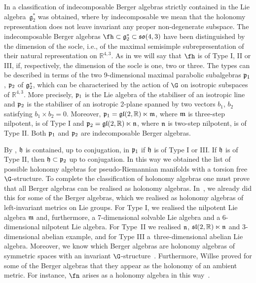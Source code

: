 In \cite{FK} a classification of indecomposable Berger algebras strictly contained in the Lie algebra~$\mathfrak g_2^*$ was obtained, where by indecomposable we mean that the holonomy representation does not leave invariant any proper non-degenerate subspace. The indecomposable Berger algebras $\fh \subset \mathfrak g_2^* \subset \mathfrak{so}(4, 3)$ have been distinguished by the dimension of the socle, i.e., of the maximal semisimple subrepresentation of their natural representation on ${\mathbb R}^{4,3}$. As in \cite{FK} we will say that $\fh$ is of Type I, II or III, if, respectively, the dimension of the socle is one, two or three. The types can be described in terms of the two 9-dimensional maximal parabolic subalgebras $\frak p_1$, $\frak p_2 $ of $\frak g_2^*$, which can be characterised by the action of $\G$ on isotropic subspaces of $\mathbb R^{4,3}$. More precisely, $\frak p_1$ is the Lie algebra of the stabiliser of an isotropic line and $\frak p_2$ is the stabiliser of an isotropic 2-plane spanned by two vectors $b_1$, $b_2$ satisfying $b_1 \times b_2 = 0$. Moreover, $\frak p_1 = {\frak {gl}} (2,\mathbb R) \ltimes \frak m$, where $\frak m$ is three-step nilpotent, is of Type I and $\frak p_2 = {\frak {gl}} (2,\mathbb R) \ltimes \frak n$, where $\frak n$ is two-step nilpotent, is of Type II.
Both $\frak p_1$ and $\frak p_2$ are indecomposable Berger algebras.

By \cite{FK}, $\frak h$ is contained, up to conjugation, in $\frak p_1$ if $\frak h$ is of Type I or III. If $\frak h$ is of Type II, then $\frak h \subset \frak p_2$ up to conjugation. In this way we obtained the list of possible holonomy algebras for pseudo-Riemannian manifolds with a torsion free $\G$-structure. To complete the classification of holonomy algebras one must prove that all Berger algebras can be realised as holonomy algebras. In~\cite{FK}, we already did this for some of the Berger algebras, which we realised as holonomy algebras of left-invariant metrics on Lie groups. For Type I, we realised the nilpotent Lie algebra $\frak m$ and, furthermore, a 7-dimensional solvable Lie algebra and a 6-dimensional nilpotent Lie algebra. For Type~II we realised $\frak n$, ${\frak {sl}}(2, \mathbb R) \ltimes \frak n$ and 3-dimensional abelian example, and for Type III a~three-dimensional abelian Lie algebra. Moreover, we know which Berger algebras are holonomy algebras of symmetric spaces with an invariant $\G$-structure~\cite{FK, K}. Furthermore, Willse proved for some of the Berger algebras that they appear as the holonomy of an ambient metric. For instance, $\fn$ arises as a holonomy algebra in this way~\cite{W}.

